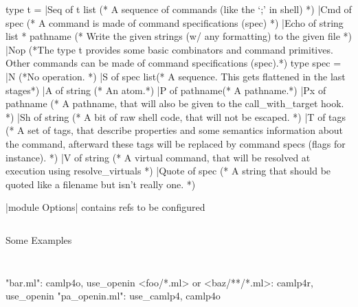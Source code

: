 \begin{redcode}
type t =
  |Seq of t list
  (* A sequence of commands (like the `;' in shell) *)
  |Cmd of spec
  (* A command is made of command specifications (spec) *)
  |Echo of string list * pathname
  (* Write the given strings (w/ any formatting) to the given file *)
  |Nop
  (*The type t provides some basic combinators and command
    primitives. Other commands can be made of command specifications
    (spec).*)
type spec =
  |N (*No operation.	*)
  |S of spec list(* A sequence. This gets flattened in the last stages*)
  |A of string	(* An atom.*)
  |P of pathname(* A pathname.*)
  |Px of pathname
  (* A pathname, that will also be given to the call_with_target
     hook. *)
  |Sh of string
  (* A bit of raw shell code, that will not be escaped. *)
  |T of tags
  (* A set of tags, that describe properties and some semantics
     information about the command, afterward these tags will be replaced
     by command specs (flags for instance). *)
  |V of string
  (* A virtual command, that will be resolved at execution using
     resolve_virtuals *)
  |Quote of spec
  (* A string that should be quoted like a filename but isn't really
   one. *)
\end{redcode}

|module Options| contains refs to be configured
\inputminted{ocaml}{code/ocamlbuild/options.mli}

Some Examples

\inputminted{ocaml}{code/ocamlbuild/myocamlbuild.2.ml}
\inputminted{ocaml}{code/ocamlbuild/myocamlbuild.3.ml}

\begin{bluetext}
 "bar.ml": camlp4o, use_openin
 <foo/*.ml> or <baz/**/*.ml>: camlp4r, use_openin
 "pa_openin.ml": use_camlp4, camlp4o  
\end{bluetext}

\inputminted{ocaml}{code/ocamlbuild/myocamlbuild.4.ml}
\inputminted{ocaml}{code/ocamlbuild/myocamlbuild.5.ml}

